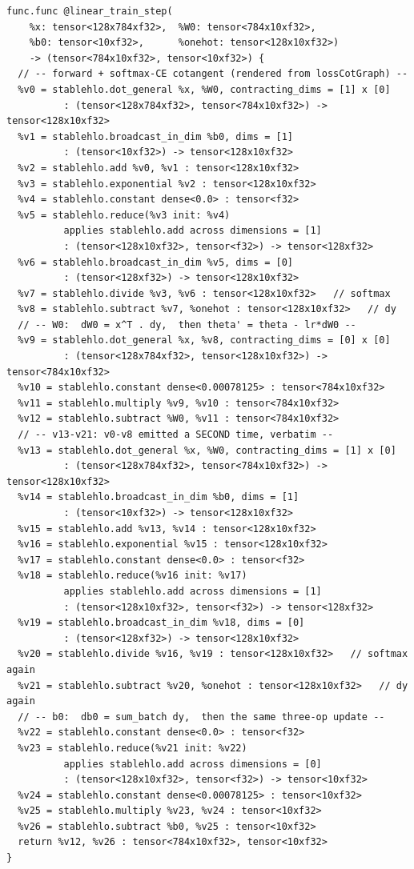 \begin{verbatim}
func.func @linear_train_step(
    %x: tensor<128x784xf32>,  %W0: tensor<784x10xf32>,
    %b0: tensor<10xf32>,      %onehot: tensor<128x10xf32>)
    -> (tensor<784x10xf32>, tensor<10xf32>) {
  // -- forward + softmax-CE cotangent (rendered from lossCotGraph) --
  %v0 = stablehlo.dot_general %x, %W0, contracting_dims = [1] x [0]
          : (tensor<128x784xf32>, tensor<784x10xf32>) -> tensor<128x10xf32>
  %v1 = stablehlo.broadcast_in_dim %b0, dims = [1]
          : (tensor<10xf32>) -> tensor<128x10xf32>
  %v2 = stablehlo.add %v0, %v1 : tensor<128x10xf32>
  %v3 = stablehlo.exponential %v2 : tensor<128x10xf32>
  %v4 = stablehlo.constant dense<0.0> : tensor<f32>
  %v5 = stablehlo.reduce(%v3 init: %v4)
          applies stablehlo.add across dimensions = [1]
          : (tensor<128x10xf32>, tensor<f32>) -> tensor<128xf32>
  %v6 = stablehlo.broadcast_in_dim %v5, dims = [0]
          : (tensor<128xf32>) -> tensor<128x10xf32>
  %v7 = stablehlo.divide %v3, %v6 : tensor<128x10xf32>   // softmax
  %v8 = stablehlo.subtract %v7, %onehot : tensor<128x10xf32>   // dy
  // -- W0:  dW0 = x^T . dy,  then theta' = theta - lr*dW0 --
  %v9 = stablehlo.dot_general %x, %v8, contracting_dims = [0] x [0]
          : (tensor<128x784xf32>, tensor<128x10xf32>) -> tensor<784x10xf32>
  %v10 = stablehlo.constant dense<0.00078125> : tensor<784x10xf32>
  %v11 = stablehlo.multiply %v9, %v10 : tensor<784x10xf32>
  %v12 = stablehlo.subtract %W0, %v11 : tensor<784x10xf32>
  // -- v13-v21: v0-v8 emitted a SECOND time, verbatim --
  %v13 = stablehlo.dot_general %x, %W0, contracting_dims = [1] x [0]
          : (tensor<128x784xf32>, tensor<784x10xf32>) -> tensor<128x10xf32>
  %v14 = stablehlo.broadcast_in_dim %b0, dims = [1]
          : (tensor<10xf32>) -> tensor<128x10xf32>
  %v15 = stablehlo.add %v13, %v14 : tensor<128x10xf32>
  %v16 = stablehlo.exponential %v15 : tensor<128x10xf32>
  %v17 = stablehlo.constant dense<0.0> : tensor<f32>
  %v18 = stablehlo.reduce(%v16 init: %v17)
          applies stablehlo.add across dimensions = [1]
          : (tensor<128x10xf32>, tensor<f32>) -> tensor<128xf32>
  %v19 = stablehlo.broadcast_in_dim %v18, dims = [0]
          : (tensor<128xf32>) -> tensor<128x10xf32>
  %v20 = stablehlo.divide %v16, %v19 : tensor<128x10xf32>   // softmax again
  %v21 = stablehlo.subtract %v20, %onehot : tensor<128x10xf32>   // dy again
  // -- b0:  db0 = sum_batch dy,  then the same three-op update --
  %v22 = stablehlo.constant dense<0.0> : tensor<f32>
  %v23 = stablehlo.reduce(%v21 init: %v22)
          applies stablehlo.add across dimensions = [0]
          : (tensor<128x10xf32>, tensor<f32>) -> tensor<10xf32>
  %v24 = stablehlo.constant dense<0.00078125> : tensor<10xf32>
  %v25 = stablehlo.multiply %v23, %v24 : tensor<10xf32>
  %v26 = stablehlo.subtract %b0, %v25 : tensor<10xf32>
  return %v12, %v26 : tensor<784x10xf32>, tensor<10xf32>
}
\end{verbatim}

